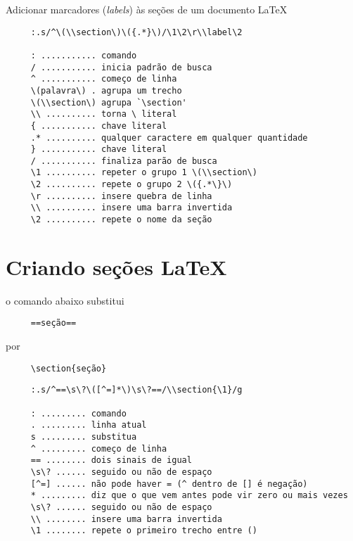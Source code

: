 Adicionar marcadores ({\em labels}) às seções de um documento \LaTeX
\begin{verbatim}
     :.s/^\(\\section\)\({.*}\)/\1\2\r\\label\2
     
     : ........... comando
     / ........... inicia padrão de busca
     ^ ........... começo de linha
     \(palavra\) . agrupa um trecho
     \(\\section\) agrupa `\section'
     \\ .......... torna \ literal
     { ........... chave literal
     .* .......... qualquer caractere em qualquer quantidade
     } ........... chave literal
     / ........... finaliza parão de busca
     \1 .......... repeter o grupo 1 \(\\section\) 
     \2 .......... repete o grupo 2 \({.*\}\)
     \r .......... insere quebra de linha
     \\ .......... insere uma barra invertida
     \2 .......... repete o nome da seção
\end{verbatim}

\section{Criando seções \LaTeX}\label{Criando seções latex}
o comando abaixo substitui

\begin{verbatim}
     ==seção==
\end{verbatim}

   por

\begin{verbatim}
     \section{seção}
\end{verbatim}

\begin{verbatim}
     :.s/^==\s\?\([^=]*\)\s\?==/\\section{\1}/g
     
     : ......... comando
     . ......... linha atual
     s ......... substitua
     ^ ......... começo de linha
     == ........ dois sinais de igual
     \s\? ...... seguido ou não de espaço
     [^=] ...... não pode haver = (^ dentro de [] é negação)
     * ......... diz que o que vem antes pode vir zero ou mais vezes
     \s\? ...... seguido ou não de espaço
     \\ ........ insere uma barra invertida
     \1 ........ repete o primeiro trecho entre ()
\end{verbatim}


